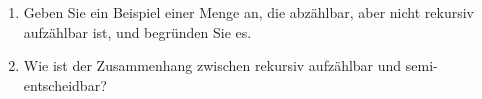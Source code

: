\documentclass{lehramt-informatik-aufgabe}
\begin{document}
\begin{enumerate}

\item Geben Sie ein Beispiel einer Menge an, die abzählbar, aber nicht
rekursiv aufzählbar ist, und begründen Sie es.

\begin{liAntwort}

\end{liAntwort}


\item Wie ist der Zusammenhang zwischen rekursiv aufzählbar und
semi-entscheidbar?

\begin{liAntwort}

\end{liAntwort}

\end{enumerate}
\end{document}
